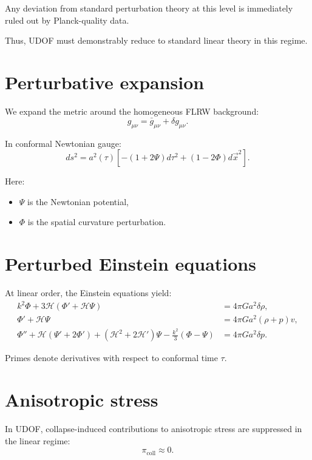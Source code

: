 \documentclass[11pt]{book}
\begin{document}
Any deviation from standard perturbation theory at this level is
immediately ruled out by Planck-quality data.

Thus, UDOF must demonstrably reduce to standard linear theory in this regime.

\section{Perturbative expansion}

We expand the metric around the homogeneous FLRW background:
\begin{equation}
g_{\mu\nu} = \bar{g}_{\mu\nu} + \delta g_{\mu\nu}.
\end{equation}

In conformal Newtonian gauge:
\begin{equation}
ds^2 = a^2(\tau)\left[
-(1+2\Psi)d\tau^2 + (1-2\Phi)d\vec{x}^2
\right].
\end{equation}

Here:
\begin{itemize}
\item $\Psi$ is the Newtonian potential,
\item $\Phi$ is the spatial curvature perturbation.
\end{itemize}

\section{Perturbed Einstein equations}

At linear order, the Einstein equations yield:
\begin{align}
k^2\Phi + 3\mathcal{H}(\Phi' + \mathcal{H}\Psi)
&= 4\pi G a^2 \delta\rho, \\
\Phi' + \mathcal{H}\Psi
&= 4\pi G a^2 (\rho + p) v, \\
\Phi'' + \mathcal{H}(\Psi' + 2\Phi') + (\mathcal{H}^2 + 2\mathcal{H}')
\Psi - \frac{k^2}{3}(\Phi - \Psi)
&= 4\pi G a^2 \delta p.
\end{align}

Primes denote derivatives with respect to conformal time $\tau$.

\section{Anisotropic stress}

In UDOF, collapse-induced contributions to anisotropic stress are suppressed
in the linear regime:
\begin{equation}
\pi_{\mathrm{coll}} \approx 0.
\end{equation}
\end{document}
